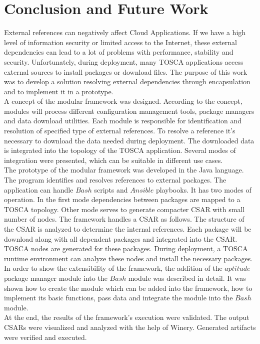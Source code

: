 

\chapter{Conclusion and Future Work}\label{chap:zusfas}
External references can negatively affect  Cloud Applications.
If we have a high level of information security or limited access to the Internet, these external dependencies can lead to a lot of problems with performance, stability and security.
Unfortunately, during deployment, many TOSCA applications access external sources to install packages or download files.
The purpose of this work was to develop a solution resolving external dependencies through encapsulation and to implement it in a prototype.\\
A concept of the modular framework was designed. 
According to the concept, modules will process different configuration management tools, package managers and data download utilities. 
Each module is responsible for identification and resolution of specified type of external references. 
To resolve a reference it's necessary to download the data needed during deployment.
The downloaded data is integrated into the topology of the TOSCA application.
Several modes of integration  were presented, which can be suitable in different use cases.\\
The prototype of the modular framework was developed in the Java language.
The program identifies and resolves references to external packages.
The application can handle $Bash$ scripts and $Ansible$ playbooks.
It has two modes of operation.
In the first mode dependencies between packages are mapped to a TOSCA topology. 
Other mode serves to generate compacter CSAR with small number of nodes. 
The framework handles a CSAR as follows.
The structure of the CSAR is analyzed to determine the internal references.
Each package will be download along with all dependent packages and integrated into the CSAR. 
TOSCA nodes are generated for these packages.
During deployment, a TOSCA runtime environment can analyze these nodes and install the necessary packages.\\
In order to show the extensibility of the framework, the addition of the $aptitude$ package manager module into the $Bash$ module was described in detail.
It  was shown how to create the module which can be added into the framework, how to implement its basic functions, pass data and integrate the module into the $Bash$ module. \\
At the end, the results of the framework's execution were validated.
The output CSARs were visualized and analyzed with the help of Winery.
Generated artifacts were verified and executed.

